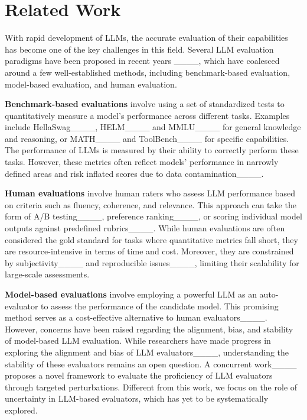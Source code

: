 \section{Related Work}
\vspace{-0.5em}

With rapid development of LLMs, the accurate evaluation of their capabilities has become one of the key challenges in this field. Several LLM evaluation paradigms have been proposed in recent years ____, which have coalesced around a few well-established methods, including benchmark-based evaluation, model-based evaluation, and human evaluation.

\textbf{Benchmark-based evaluations} involve using a set of standardized tests to quantitatively measure a model’s performance across different tasks. Examples include HellaSwag____, HELM____ and MMLU____ for general knowledge and reasoning, or MATH____ and ToolBench____ for specific capabilities. The performance of LLMs is measured by their ability to correctly perform these tasks. However, these metrics often reflect models' performance in narrowly defined areas and risk inflated scores due to data contamination____.

\textbf{Human evaluations} involve human raters who assess LLM performance based on criteria such as fluency, coherence, and relevance. This approach can take the form of A/B testing____, preference ranking____, or scoring individual model outputs against predefined rubrics____. While human evaluations are often considered the gold standard for tasks where quantitative metrics fall short, they are resource-intensive in terms of time and cost. Moreover, they are constrained by subjectivity____ and reproducible issues____, limiting their scalability for large-scale assessments.

\textbf{Model-based evaluations} involve employing a powerful LLM as an auto-evaluator to assess the performance of the candidate model. This promising method serves as a cost-effective alternative to human evaluators____. However, concerns have been raised regarding the alignment, bias, and stability of model-based LLM evaluation. While researchers have made progress in exploring the alignment and bias of LLM evaluators____, understanding the stability of these evaluators remains an open question. A concurrent work____ proposes a novel framework to evaluate the proficiency of LLM evaluators through targeted perturbations. Different from this work, we focus on the role of uncertainty in LLM-based evaluators, which has yet to be systematically explored.

